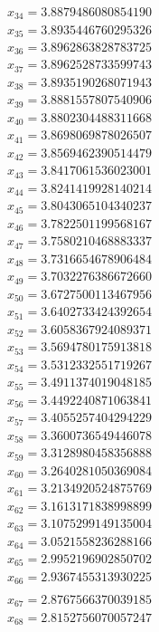 \begin{multicols}{3}
\begin{align*}
		x_{34} = 3.8879486080854190\\
		x_{35} = 3.8935446760295326\\
		x_{36} = 3.8962863828783725\\
		x_{37} = 3.8962528733599743\\
		x_{38} = 3.8935190268071943\\
		x_{39} = 3.8881557807540906\\
		x_{40} = 3.8802304488311668\\
		x_{41} = 3.8698069878026507\\
		x_{42} = 3.8569462390514479\\
		x_{43} = 3.8417061536023001\\
		x_{44} = 3.8241419928140214\\
		x_{45} = 3.8043065104340237\\
		x_{46} = 3.7822501199568167\\
		x_{47} = 3.7580210468883337\\
		x_{48} = 3.7316654678906484\\
		x_{49} = 3.7032276386672660\\
		x_{50} = 3.6727500113467956\\
		x_{51} = 3.6402733424392654\\
		x_{52} = 3.6058367924089371\\
		x_{53} = 3.5694780175913818\\
		x_{54} = 3.5312332551719267\\
		x_{55} = 3.4911374019048185\\
		x_{56} = 3.4492240871063841\\
		x_{57} = 3.4055257404294229\\
		x_{58} = 3.3600736549446078\\
		x_{59} = 3.3128980458356888\\
		x_{60} = 3.2640281050369084\\
		x_{61} = 3.2134920524875769\\
		x_{62} = 3.1613171838998899\\
		x_{63} = 3.1075299149135004\\
		x_{64} = 3.0521558236288166\\
		x_{65} = 2.9952196902850702\\
		x_{66} = 2.9367455313930225\\
	\end{align*}
	\vfill
	\columnbreak
	\begin{align*}
		x_{67} = 2.8767566370039185\\
		x_{68} = 2.8152756070057247\\

\end{align*}
\end{multicols}
